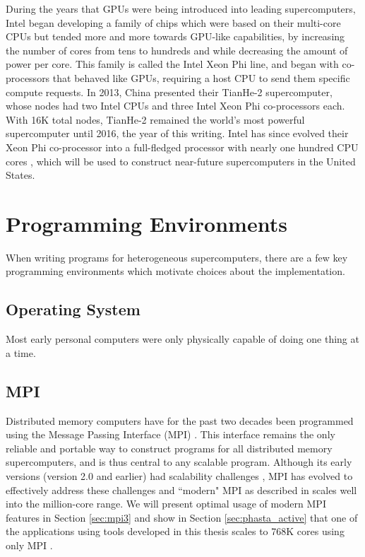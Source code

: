 During the years that GPUs were being introduced into leading supercomputers,
Intel began developing a family of chips which were based on
their multi-core CPUs but tended more and more towards GPU-like capabilities,
by increasing the number of cores from tens to hundreds and while decreasing
the amount of power per core.
This family is called the Intel Xeon Phi line, and began with co-processors
that behaved like GPUs, requiring a host CPU to send them specific compute
requests.
In 2013, China presented their TianHe-2 supercomputer, whose nodes had two Intel
CPUs and three Intel Xeon Phi co-processors each.
With 16K total nodes, TianHe-2 remained the world's most powerful supercomputer
until 2016, the year of this writing.
Intel has since evolved their Xeon Phi co-processor into a full-fledged
processor with nearly one hundred CPU cores \cite{jeffers2013intel},
which will be used to construct near-future supercomputers in the United States.

\section{Programming Environments}

When writing programs for heterogeneous supercomputers,
there are a few key programming environments which motivate
choices about the implementation.

\subsection{Operating System}

Most early personal computers were only physically
capable of doing one thing at a time.

\subsection{MPI}

Distributed memory computers have for the past two decades
been programmed using the Message Passing Interface (MPI)
\cite{hempel1994mpi,walker1996mpi}.
This interface remains the only reliable and portable way to construct
programs for all distributed memory supercomputers,
and is thus central to any scalable program.
Although its early versions (version 2.0 and earlier) had
scalability challenges \cite{balaji2009mpi}, MPI has evolved
to effectively address these challenges and ``modern" MPI
as described in \cite{gropp2014using} scales well into the
million-core range.
We will present optimal usage of modern MPI features in
Section \ref{sec:mpi3} and show in Section \ref{sec:phasta_active}
that one of the applications using tools developed
in this thesis scales to 768K cores using only MPI \cite{rasquinCise2014}.


